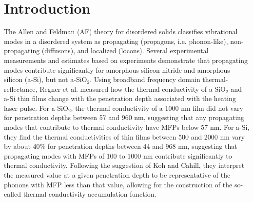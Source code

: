 \documentclass[aps,prb,onecolumn,preprint,superscriptaddress,footinbib,amsmath,amssymb,floatfix]{revtex4}
\begin{document}
\section{\label{S:Introduction}Introduction}


The Allen and Feldman (AF) theory for disordered solids   
classifies vibrational modes in a disordered system as 
propagating (propagons, i.e. phonon-like), 
non-propagating (diffusons), and 
localized (locons).\cite{allen_thermal_1993,allen_diffusons_1999} 
Several experimental measurements and estimates based on experiments 
demonstrate that propagating modes contribute significantly 
for amorphous silicon nitride\cite{sultan_heat_2013} and
amorphous silicon (a-Si),\cite{cahill_thermal_1994,liu_high_2009,
yang_anomalously_2010} 
but not 
a-SiO$_2$.\cite{love_estimate_1990,lee_heat_1997,baldi_thermal_2008} 
Using broadband frequency domain thermal-reflectance, 
Regner et al. measured how the thermal conductivity of a-SiO$_2$ and 
a-Si thin films change with the penetration depth associated with the 
heating laser pulse.\cite{regner_broadband_2013} 
For a-SiO$_2$, the thermal conductivity of a 1000 nm 
film did not vary for penetration depths between 57 and 960 nm, 
suggesting that any propagating modes that contribute to thermal 
conductivity have MFPs below 57 nm. For a-Si, they find the 
thermal conductivities of thin films between 500 and 2000 nm 
vary by about 
40$\%$ for penetration depths between 44 and 968 nm, suggesting 
that propagating modes with MFPs of 100 to 1000 nm contribute 
significantly to thermal conductivity.\cite{regner_broadband_2013}  
Following the suggestion of Koh and Cahill, they interpret the 
measured value at a given penetration depth to be representative 
of the phonons with MFP less than that value, allowing for the 
construction of the so-called thermal conductivity accumulation 
function.\cite{dames_thermal_2005,minnich_thermal_2011,
yang_mean_2013}
\end{document}

